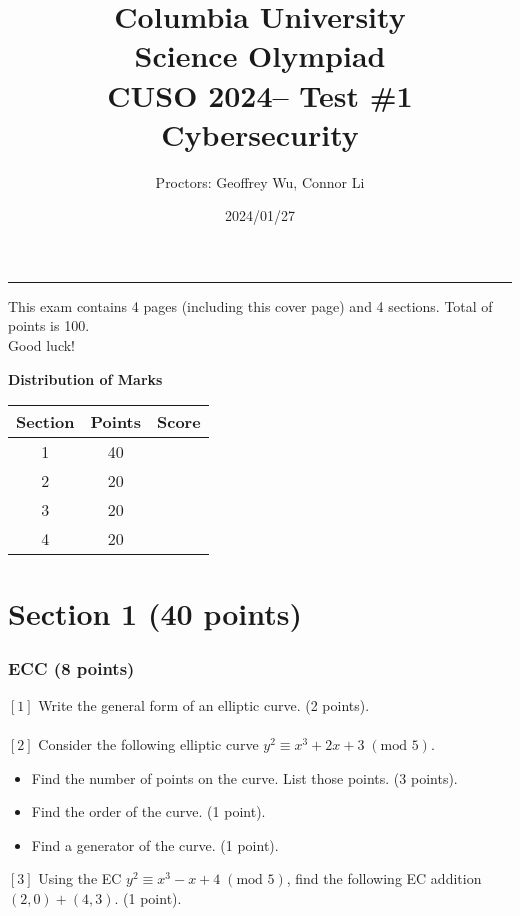 \documentclass[letterpaper,12pt,addpoints]{exam}
\newcommand{\university}{Columbia University}
\newcommand{\faculty}{Science Olympiad}
\newcommand{\class}{CUSO 2024}
\newcommand{\examnum}{Test \#1}
\newcommand{\content}{Cybersecurity}
\newcommand{\examdate}{2024/01/27}
\begin{document}
\title{\Large \textbf{\university\\ \faculty\\
\bigskip
\class -- \examnum \\ \content}}
\author{Proctors: Geoffrey Wu, Connor Li}
\date{\examdate}
\maketitle
\begin{flushleft}
\medskip
{}
\end{flushleft}
\noindent \rule{\textwidth}{1pt}

\noindent This exam contains 4 pages (including this cover page) and 4 sections. Total of points is 100.\\
Good luck!

\begin{center}
\textbf{Distribution of Marks}\\
\end{center}
\begin{center}
\begin{tabular} {| c | c | c |}
    \hline
    Section & Points & Score \\
    \hline
    1 & 40 & \\
    \hline
    2 & 20 & \\
    \hline
    3 & 20 & \\
    \hline
    4 & 20 & \\
    \hline
\end{tabular}
\end{center}
\clearpage

\section*{Section 1 (40 points)}
\subsubsection*{ECC (8 points)}
$[1]$ Write the general form of an elliptic curve. (2 points).\\
\\
$[2]$ Consider the following elliptic curve $y^2 \equiv x^3 + 2x + 3\;(\text{mod } 5)$. 
\begin{itemize}
    \item Find the number of points on the curve. List those points. (3 points).
    \item Find the order of the curve. (1 point).
    \item Find a generator of the curve. (1 point).
\end{itemize}
$[3]$ Using the EC $y^2 \equiv x^3 - x + 4 \;(\text{mod } 5)$, find the following EC addition $(2,0) + (4,3)$. (1 point).
\end{document}
